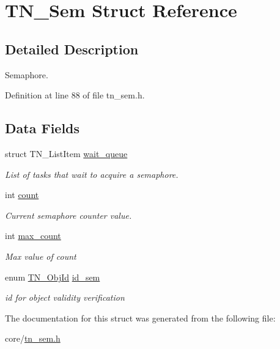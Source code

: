 \hypertarget{structTN__Sem}{\section{T\+N\+\_\+\+Sem Struct Reference}
\label{structTN__Sem}
}


\subsection{Detailed Description}
Semaphore. 

Definition at line 88 of file tn\+\_\+sem.\+h.

\subsection*{Data Fields}
\begin{DoxyCompactItemize}
\item 
\hypertarget{structTN__Sem_ac6cf5b47221528a5ce024c60b92be280}{struct T\+N\+\_\+\+List\+Item \hyperlink{structTN__Sem_ac6cf5b47221528a5ce024c60b92be280}{wait\+\_\+queue}}\label{structTN__Sem_ac6cf5b47221528a5ce024c60b92be280}

\begin{DoxyCompactList}\small\item\em List of tasks that wait to acquire a semaphore. \end{DoxyCompactList}\item 
\hypertarget{structTN__Sem_a5a2358e2425da2930ef8e105a642822b}{int \hyperlink{structTN__Sem_a5a2358e2425da2930ef8e105a642822b}{count}}\label{structTN__Sem_a5a2358e2425da2930ef8e105a642822b}

\begin{DoxyCompactList}\small\item\em Current semaphore counter value. \end{DoxyCompactList}\item 
\hypertarget{structTN__Sem_abd62d79c3aace05abd7252f2058b1e5b}{int \hyperlink{structTN__Sem_abd62d79c3aace05abd7252f2058b1e5b}{max\+\_\+count}}\label{structTN__Sem_abd62d79c3aace05abd7252f2058b1e5b}

\begin{DoxyCompactList}\small\item\em Max value of {\ttfamily count} \end{DoxyCompactList}\item 
\hypertarget{structTN__Sem_a810526e9b3d5595278ebb70e59a128e1}{enum \hyperlink{tn__common_8h_ae779dd1f6735f6e139fb70acd004d976}{T\+N\+\_\+\+Obj\+Id} \hyperlink{structTN__Sem_a810526e9b3d5595278ebb70e59a128e1}{id\+\_\+sem}}\label{structTN__Sem_a810526e9b3d5595278ebb70e59a128e1}

\begin{DoxyCompactList}\small\item\em id for object validity verification \end{DoxyCompactList}\end{DoxyCompactItemize}


The documentation for this struct was generated from the following file\+:\begin{DoxyCompactItemize}
\item 
core/\hyperlink{tn__sem_8h}{tn\+\_\+sem.\+h}\end{DoxyCompactItemize}

